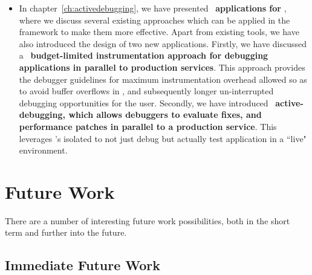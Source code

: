 \begin{itemize}
	\item In chapter~\ref{ch:activedebugging}, we have presented ~\textbf{applications for \livedebugging}, where we discuss several existing approaches which can be applied in the \parikshan framework to make them more effective. 
	Apart from existing tools, we have also introduced the design of two new applications. 
	Firstly, we have discussed a ~\textbf{budget-limited instrumentation approach for debugging applications in parallel to production services}. 
	This approach provides the debugger guidelines for maximum instrumentation overhead allowed so as to avoid buffer overflows in \parikshan, and subsequently longer un-interrupted debugging opportunities for the user.
	Secondly, we have introduced ~\textbf{active-debugging, which allows debuggers to evaluate fixes, and performance patches in parallel to a production service}. This leverages \parikshan's isolated \debugcontainer to not just debug but actually test application in a ``live" environment. 
	 
\end{itemize}

\section{Future Work}
\label{sec:future}

There are a number of interesting future work possibilities, both in the short term and further into the future.


\subsection{Immediate Future Work}
\label{sec:immediateFutureWork}


